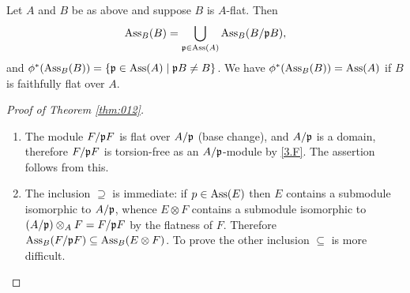 \documentclass[../main]{subfiles}
\begin{document}
\begin{corollary}\label{cor:09.01}
Let $A$ and $B$ be as above and suppose $B$ is $A$-flat. Then \[\operatorname{Ass}_B(B) = \bigcup_{\mathfrak{p}\in\operatorname{Ass}(A)}\operatorname{Ass}_B (B/\mathfrak{p}B),\] and $\phi^\ast(\operatorname{Ass}_B(B)) = \{\mathfrak{p} \in \operatorname{Ass}(A) \mid \mathfrak{p}B \neq B\}$. We have $\phi^\ast(\operatorname{Ass}_B(B))= \operatorname{Ass}(A)$ if $B$ is faithfully flat over $A$.
\end{corollary}

\begin{proof}[Proof of Theorem \ref{thm:012}]
\begin{enumerate}[label= (\roman*)]
    \item The module $F/\mathfrak{p}F$ is flat over $A/\mathfrak{p}$ (base change), and $A/\mathfrak{p}$ is a domain, therefore $F/\mathfrak{p}F$ is torsion-free as an $A/\mathfrak{p}$-module by \ref{3.F}. The assertion follows from this.
    \item The inclusion $\supseteq$ is immediate: if $p \in \operatorname{Ass}(E)$ then $E$ contains a submodule isomorphic to $A/\mathfrak{p}$, whence $E\otimes F$ contains a submodule isomorphic to $(A/\mathfrak{p})\otimes_AF = F/\mathfrak{p}F$ by the flatness of $F$. Therefore \newline $\operatorname{Ass}_B(F/\mathfrak{p}F)\subseteq\operatorname{Ass}_B(E\otimes F)$. To prove the other inclusion $\subseteq$ is more difficult. 


\end{enumerate}
\end{proof}
\end{document}
